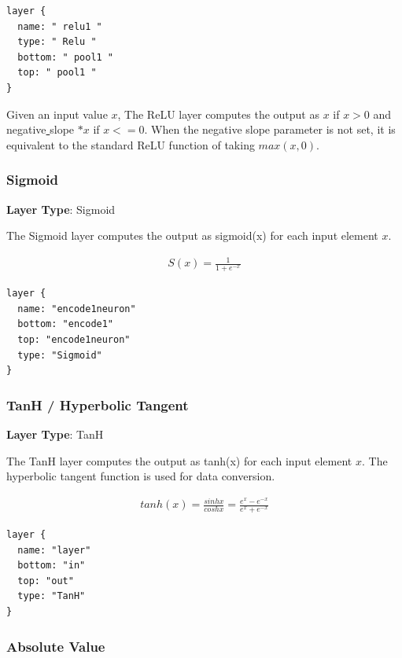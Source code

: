 \documentclass[12pt]{article}
\begin{document}
\begin{lstlisting}[style=json, frame=single]
layer {
  name: " relu1 "
  type: " Relu "
  bottom: " pool1 "
  top: " pool1 "
}
\end{lstlisting}

Given an input value $x$, The ReLU layer computes the output as $x$ if $x > 0$ and negative\underline{{ }{ }}slope $* x$ if $x <= 0$. When the negative slope parameter is not set, it is equivalent to the standard ReLU function of taking $max(x, 0)$.

\subsubsection{Sigmoid}

\noindent \textbf{Layer Type}: Sigmoid

The Sigmoid layer computes the output as sigmoid(x) for each input element $x$.


\begin{gather}
S(x) = \frac{1}{1+e^{-x}}
\end{gather}


\begin{lstlisting}[style=json, frame=single]
layer {
  name: "encode1neuron"
  bottom: "encode1"
  top: "encode1neuron"
  type: "Sigmoid"
}
\end{lstlisting}

\subsubsection{TanH / Hyperbolic Tangent}

\noindent \textbf{Layer Type}: TanH

The TanH layer computes the output as tanh(x) for each input element $x$. The hyperbolic tangent function is used for data conversion.

\begin{gather}
tanh(x) = \frac{sinh x}{cosh x}=\frac{e^{x}-e^{-x}}{e^{x}+e^{-x}}
\end{gather}

\begin{lstlisting}[style=json, frame=single]
layer {
  name: "layer"
  bottom: "in"
  top: "out"
  type: "TanH"
}
\end{lstlisting}

\subsubsection{Absolute Value}
\end{document}

